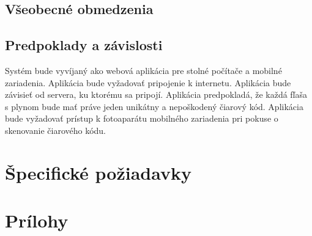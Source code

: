 \documentclass[hreffootnote]{zah}
\begin{document}
\subsection{Všeobecné obmedzenia}
\label{gen:constraints}

\subsection{Predpoklady a závislosti}
\label{gen:deps}

Systém bude vyvíjaný ako webová aplikácia pre stolné počítače a mobilné zariadenia. Aplikácia bude vyžadovať pripojenie k internetu. Aplikácia bude závisieť od servera, ku ktorému sa pripojí. Aplikácia predpokladá, že každá fľaša s plynom bude mať práve jeden unikátny a nepoškodený čiarový kód. Aplikácia bude vyžadovať prístup k fotoaparátu mobilného zariadenia pri pokuse o skenovanie čiarového kódu.

\cleardoublepage
\section{Špecifické požiadavky}
\label{reqs}

\cleardoublepage
\section{Prílohy}
\end{document}
